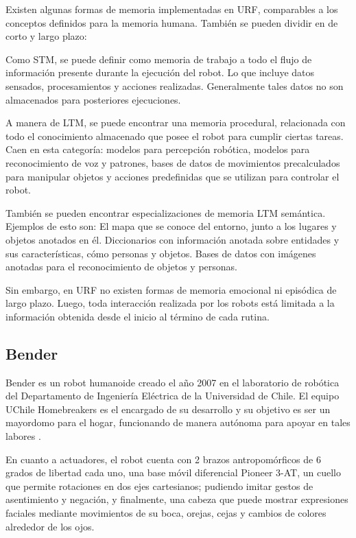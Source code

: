 Existen algunas formas de memoria implementadas en URF, comparables a los conceptos definidos para la memoria humana. También se pueden dividir en de corto y largo plazo:

Como STM, se puede definir como memoria de trabajo a todo el flujo de información presente durante la ejecución del robot. Lo que incluye datos sensados, procesamientos y acciones realizadas. Generalmente tales datos no son almacenados para posteriores ejecuciones.

A manera de LTM, se puede encontrar una memoria procedural, relacionada con todo el conocimiento almacenado que posee el robot para cumplir ciertas tareas. Caen en esta categoría: modelos para percepción robótica, modelos para reconocimiento de voz y patrones, bases de datos de movimientos precalculados para manipular objetos y acciones predefinidas que se utilizan para controlar el robot.

También se pueden encontrar especializaciones de memoria LTM semántica. Ejemplos de esto son: El mapa que se conoce del entorno, junto a los lugares y objetos anotados en él. Diccionarios con información anotada sobre entidades y sus características, cómo personas y objetos. Bases de datos con imágenes anotadas para el reconocimiento de objetos y personas. 

Sin embargo, en URF no existen formas de memoria emocional ni episódica de largo plazo. Luego, toda interacción realizada por los robots está limitada a la información obtenida desde el inicio al término de cada rutina.



\subsection{Bender}

Bender es un robot humanoide creado el año 2007 en el laboratorio de robótica del Departamento de Ingeniería Eléctrica de la Universidad de Chile. El equipo UChile Homebreakers es el encargado de su desarrollo y  su objetivo es ser un mayordomo para el hogar, funcionando de manera autónoma para apoyar en tales labores \cite{uchile-robotics}.



En cuanto a actuadores, el robot cuenta con 2 brazos antropomórficos de 6 grados de libertad cada uno, una base móvil diferencial Pioneer 3-AT, un cuello que permite rotaciones en dos ejes cartesianos; pudiendo imitar gestos de asentimiento y negación, y finalmente, una cabeza que puede mostrar expresiones faciales mediante movimientos de su boca, orejas, cejas y cambios de colores alrededor de los ojos.

